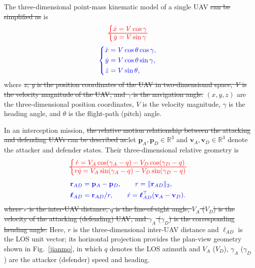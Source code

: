 \documentclass[lettersize,journal]{IEEEtran}
\newcommand{\hladd}[1]{{\color{blue}#1}}
\newcommand{\hldel}[1]{{\color{red}\sout{#1}}}
\newcommand{\hldeleq}[1]{%
  {\color{red}%
   \sbox0{$\displaystyle #1$}%
   \rlap{\usebox0}%
   \rule[0.5\dimexpr\ht0-\dp0\relax]{\wd0}{0.6pt}}}
\begin{document}
The \hladd{three-dimensional point-mass} kinematic model of a single UAV \hldel{can be simplified as} \hladd{is}
\begin{equation}
\label{yundongxue}
\hldeleq{\left\{\begin{matrix}\dot{x} =V\cos\gamma \\
\dot{y} =V\sin\gamma \end{matrix}\right.}
\end{equation}
\begin{equation}
\label{yundongxue3d}
{\color{blue}\left\{\begin{aligned}
\dot{x}&=V\cos\theta\cos\gamma,\\
\dot{y}&=V\cos\theta\sin\gamma,\\
\dot{z}&=V\sin\theta,
\end{aligned}\right.}
\end{equation}
where \hldel{\emph{x}, \emph{y} is the position coordinates of the UAV in two-dimensional space,
\emph{V} is the velocity magnitude of the UAV, and $\gamma$ is the navigation angle.}%
\hladd{$(x,y,z)$ are the three-dimensional position coordinates, $V$ is the velocity magnitude,
$\gamma$ is the heading angle, and $\theta$ is the flight-path (pitch) angle.}

In an interception mission, \hldel{the relative motion relationship between the attacking and
defending UAVs can be described as:}\hladd{let $\mathbf{p}_A,\mathbf{p}_D\in\mathbb{R}^3$ and
$\mathbf{v}_A,\mathbf{v}_D\in\mathbb{R}^3$ denote the attacker and defender states. Their
three-dimensional relative geometry is}
\begin{equation}
\label{gongfang}
\hldeleq{\left\{\begin{matrix}\dot{r} =V_{A}\cos(\gamma_{A}-q)-V_{D}\cos(\gamma_{D}-q) \\
r\dot{q} =V_{A}\sin(\gamma_{A}-q)-V_{D}\sin(\gamma_{D}-q)\end{matrix}\right.}
\end{equation}
\begin{equation}
\label{gongfang3d}
{\color{blue}\begin{aligned}
\mathbf{r}_{AD}&=\mathbf{p}_A-\mathbf{p}_D,\qquad
r=\|\mathbf{r}_{AD}\|_2,\\
\boldsymbol{\ell}_{AD}&=\mathbf{r}_{AD}/r,\qquad
\dot{r}=\boldsymbol{\ell}_{AD}^{\top}(\mathbf{v}_A-\mathbf{v}_D).
\end{aligned}}
\end{equation}
\hldel{where $r$ is the inter-UAV distance, $q$ is the line-of-sight angle, $V_{A}$ ($V_{D}$) is the
velocity of the attacking (defending) UAV, and $\gamma_{A}$ ($\gamma_{D}$) is the
corresponding heading angle.}%
\hladd{Here, $r$ is the three-dimensional inter-UAV distance and $\boldsymbol{\ell}_{AD}$ is the
LOS unit vector; its horizontal projection provides the plan-view geometry shown in
Fig.~\ref{jianmo}, in which $q$ denotes the LOS azimuth and $V_{A}$ ($V_{D}$),
$\gamma_{A}$ ($\gamma_{D}$) are the attacker (defender) speed and heading.}
\end{document}
